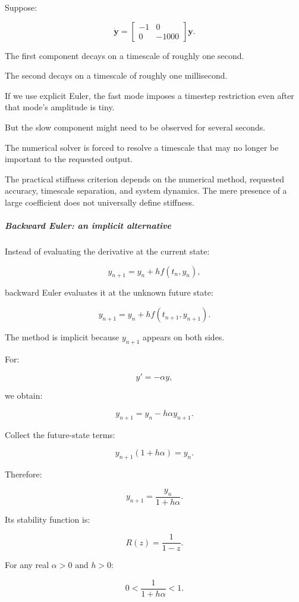 Suppose:

\[
\dot{\mathbf y}= \begin{bmatrix} -1&0\\ 0&-1000 \end{bmatrix}\mathbf y.
\]

The first component decays on a timescale of roughly one second.

The second decays on a timescale of roughly one millisecond.

If we use explicit Euler, the fast mode imposes a timestep restriction even after that mode's amplitude is tiny.

But the slow component might need to be observed for several seconds.

The numerical solver is forced to resolve a timescale that may no longer be important to the requested output.

The practical stiffness criterion depends on the numerical method, requested accuracy, timescale separation, and system dynamics. The mere presence of a large coefficient does not universally define stiffness.

\subparagraph{Backward Euler: an implicit alternative}\label{02-foundations-ii-ch025-backward-euler-an-implicit-alternative}

Instead of evaluating the derivative at the current state:

\[
y_{n+1}=y_n+hf(t_n,y_n),
\]

backward Euler evaluates it at the unknown future state:

\[
\boxed{ y_{n+1}=y_n+hf(t_{n+1},y_{n+1}) }.
\]

The method is implicit because \(y_{n+1}\) appears on both sides.

For:

\[
y'=-\alpha y,
\]

we obtain:

\[
y_{n+1}=y_n-h\alpha y_{n+1}.
\]

Collect the future-state terms:

\[
y_{n+1}(1+h\alpha)=y_n.
\]

Therefore:

\[
\boxed{ y_{n+1}=\frac{y_n}{1+h\alpha} }.
\]

Its stability function is:

\[
R(z)=\frac1{1-z}.
\]

For any real \(\alpha>0\) and \(h>0\):

\[
0<\frac1{1+h\alpha}<1.
\]

